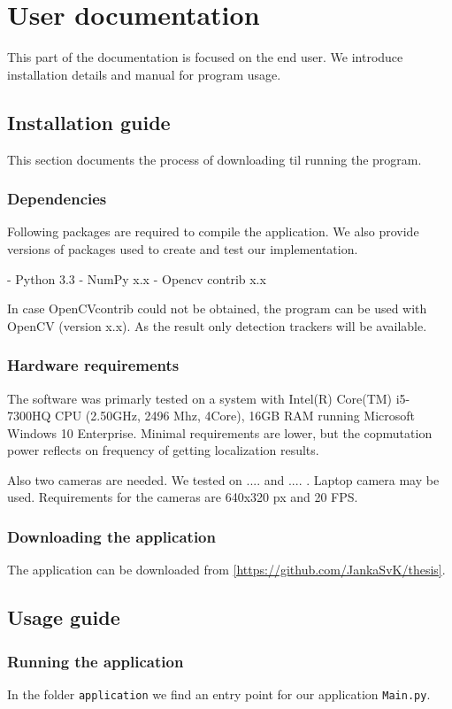 \chapter{User documentation}
This part of the documentation is focused on the end user. We introduce
installation details and manual for program usage.

\section{Installation guide}
This section documents the process of downloading til running the program.

\subsection{Dependencies}
Following packages are required to compile the application. We also provide
versions of packages used to create and test our implementation.

- Python	3.3
- NumPy		x.x
- Opencv contrib	x.x

In case OpenCVcontrib could not be obtained, the program can be used with
OpenCV (version x.x). As the result only detection trackers will be available.

\subsection{Hardware requirements}
The software was primarly tested on a system with Intel(R) Core(TM) i5-7300HQ
CPU (2.50GHz, 2496 Mhz, 4Core), 16GB RAM running Microsoft Windows 10
Enterprise. Minimal requirements are lower, but the copmutation power reflects
on frequency of getting localization results.

Also two cameras are needed. We tested on .... and .... . Laptop camera may be
used. Requirements for the cameras are 640x320 px and 20 FPS.

\subsection{Downloading the application}
The application can be downloaded from \ref{https://github.com/JankaSvK/thesis}.

\section{Usage guide}

\subsection{Running the application}
In the folder \verb+application+ we find an entry point for our application
\verb+Main.py+.

